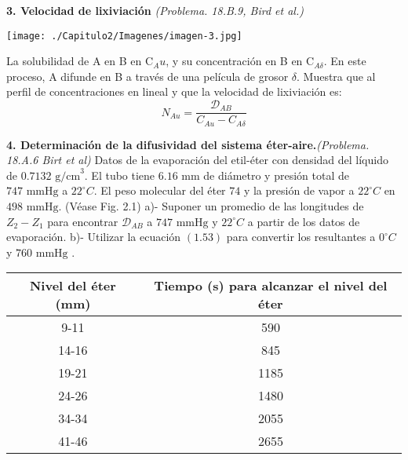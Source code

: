 \flushleft
\textbf{3. Velocidad de lixiviación} \textit{(Problema. 18.B.9, Bird et al.)}
\flushleft
\begin{minipage}{0.4\textwidth} %
    \texttt{[image: ./Capitulo2/Imagenes/imagen-3.jpg]} %
\end{minipage}
\hfill %
\begin{minipage}{0.5\textwidth} %
La solubilidad de A en B en C$_Au$, y su concentración en B en C$_{A\delta}$. En este proceso, A difunde en B a través de una película de grosor $\delta$. Muestra que al perfil de concentraciones en lineal y que la velocidad de lixiviación es: \[N_{Au}= \frac{\mathscr{D}_{AB}}{C_{Au}-C_{A\delta}}\]
\end{minipage}
\vspace{0.1cm} %
\flushleft

\textbf{4. Determinación de la difusividad del sistema éter-aire.}\textit{(Problema. 18.A.6 Birt et al)}
\vspace{0.2cm}
\flushleft
Datos de la evaporación del etil-éter con densidad del líquido de $0.7132 \text{ g/cm}^3$. El tubo tiene $6.16 \text{ mm}$ de diámetro y presión total de $747 \text{ mmHg}$  a $22^\circ C$. El peso molecular del éter $74$  y la presión de vapor a $22^\circ C$ en $498 \text{ mmHg}$. (Véase Fig. 2.1)
\vspace{0.2cm}
\flushleft
a)- Suponer un promedio de las longitudes de $Z_2 - Z_1$ para encontrar $\mathscr{D}_{AB}$ a $747 \text{ mmHg}$ y $22^\circ C$ a partir de los datos de evaporación.
\flushleft
b)- Utilizar la ecuación $(1.53)$ para convertir los resultantes a $0^\circ C$ y $760\text{ mmHg}$ .

\begin{table}[h]
    \centering
    \begin{tabular}{cc} %
        \toprule
        Nivel del éter (mm) & Tiempo (s) para alcanzar el nivel del éter \\
        \midrule
        9-11  & 590  \\
        14-16 & 845  \\
        19-21 & 1185 \\
        24-26 & 1480 \\
        34-34 & 2055 \\
        41-46 & 2655 \\
        \bottomrule
    \end{tabular}
\end{table}


